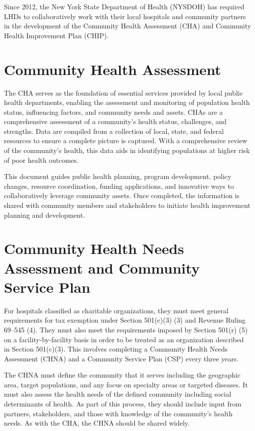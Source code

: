 \documentclass[
  english,
  letterpaper,
]{report}
\begin{document}
Since 2012, the New York State Department of Health (NYSDOH) has
required LHDs to collaboratively work with their local hospitals and
community partners in the development of the Community Health Assessment
(CHA) and Community Health Improvement Plan (CHIP).

\section{Community Health Assessment}\label{community-health-assessment}

The CHA serves as the foundation of essential services provided by local
public health departments, enabling the assessment and monitoring of
population health status, influencing factors, and community needs and
assets. CHAs are a comprehensive assessment of a community's health
status, challenges, and strengths. Data are compiled from a collection
of local, state, and federal resources to ensure a complete picture is
captured. With a comprehensive review of the community's health, this
data aids in identifying populations at higher risk of poor health
outcomes.

This document guides public health planning, program development, policy
changes, resource coordination, funding applications, and innovative
ways to collaboratively leverage community assets. Once completed, the
information is shared with community members and stakeholders to
initiate health improvement planning and development.

\section{Community Health Needs Assessment and Community Service
Plan}\label{community-health-needs-assessment-and-community-service-plan}

For hospitals classified as charitable organizations, they must meet
general requirements for tax exemption under Section 501(c)(3) (3) and
Revenue Ruling 69--545 (4). They must also meet the requirements imposed
by Section 501(r) (5) on a facility-by-facility basis in order to be
treated as an organization described in Section 501(c)(3). This involves
completing a Community Health Needs Assessment (CHNA) and a Community
Service Plan (CSP) every three years.

The CHNA must define the community that it serves including the
geographic area, target populations, and any focus on specialty areas or
targeted diseases. It must also assess the health needs of the defined
community including social determinants of health. As part of this
process, they should include input from partners, stakeholders, and
those with knowledge of the community's health needs. As with the CHA,
the CHNA should be shared widely.
\end{document}
